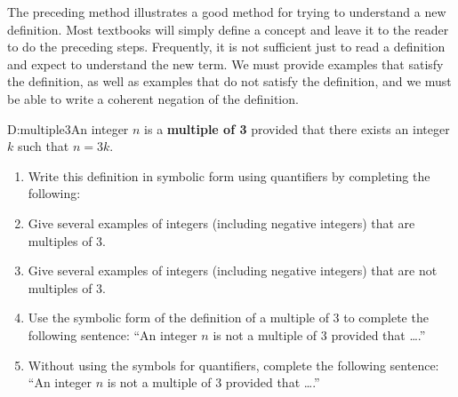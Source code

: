 The preceding method illustrates a good method for trying to understand a new definition.  Most textbooks will simply define a concept and leave it to the reader to do the preceding steps.  Frequently, it is not sufficient just to read a definition and expect to understand the new term.  We must provide examples that satisfy the definition, as well as examples that do not satisfy the definition, and we must be able to write a coherent negation of the definition.
\hbreak

\begin{prog}\label{pr:mutliple3} \hfill 
\begin{defbox}{D:multiple3}{An integer  $n$  is a \textbf{multiple of 3} provided that there exists an integer  $k$  such that  $n = 3k$.}  
\end{defbox}

\begin{enumerate}
  \item Write this definition in symbolic form using quantifiers by completing the following:

  \item Give several examples of integers (including negative integers) that are multiples of 3.
  \item Give several examples of integers (including negative integers) that are not multiples of 3.
  \item Use the symbolic form of the definition of a multiple of 3 to complete the following sentence: ``An integer $n$  is not a multiple of 3 provided that \ldots .''

  \item Without using the symbols for quantifiers, complete the following sentence:  ``An integer  $n$ is not a multiple of 3 provided that  \ldots .''
\end{enumerate}
\end{prog}
\hbreak


\endinput
